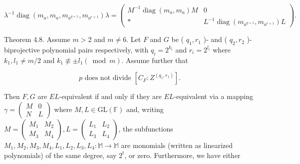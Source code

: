 \documentclass[10pt]{article}
\begin{document}
\[
\lambda^{-1} \operatorname{diag}\left(m_{a}, m_{a}, m_{a^{q+1}}, m_{a^{r+1}}\right) \lambda=\left(\begin{array}{cc}
M^{-1} \operatorname{diag}\left(m_{a}, m_{a}\right) M & 0  \tag{4.1}\\
* & L^{-1} \operatorname{diag}\left(m_{a^{q+1}}, m_{a^{r+1}}\right) L
\end{array}\right) .
\]

Theorem 4.8. Assume $m>2$ and $m \neq 6$. Let $F$ and $G$ be ( $q_{1}, r_{1}$ )- and ( $q_{2}, r_{2}$ )-biprojective polynomial pairs respectively, with $q_{i}=2^{k_{i}}$ and $r_{i}=2^{l_{i}}$ where $k_{1}, l_{1} \neq m / 2$ and $k_{1} \not \equiv \pm l_{1} (\bmod m)$. Assume further that


\begin{equation*}
p \text { does not divide }\left[C_{F}: Z^{\left(q_{1}, r_{1}\right)}\right] . \tag{C}
\end{equation*}


Then $F, G$ are $E L$-equivalent if and only if they are $E L$-equivalent via a mapping $\gamma=\left(\begin{array}{cc}M & 0 \\ N & L\end{array}\right)$ where $M, L \in \mathrm{GL}(\mathbb{F})$ and, writing $M=\left(\begin{array}{ll}M_{1} & M_{2} \\ M_{3} & M_{4}\end{array}\right), L=\left(\begin{array}{ll}L_{1} & L_{2} \\ L_{3} & L_{4}\end{array}\right)$, the subfunctions $M_{1}, M_{2}, M_{3}, M_{4}, L_{1}, L_{2}, L_{3}, L_{4}: \mathbb{M} \rightarrow \mathbb{M}$ are monomials (written as linearized polynomials) of the same degree, say $2^{t}$, or zero. Furthermore, we have either
\end{document}
